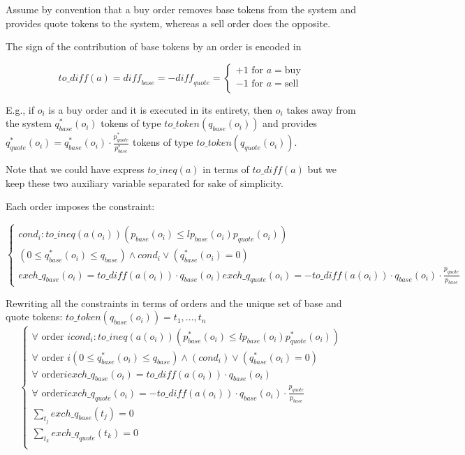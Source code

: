 \documentclass[11pt, reqno]{amsart}
\begin{document}
Assume by convention that a buy order removes base tokens from the system and
provides quote tokens to the system, whereas a sell order does the opposite.

The sign of the contribution of base tokens by an order is encoded in

$$
\mathit{to\_diff}(a) = \mathit{diff}_{base} = -\mathit{diff}_{quote} =
\begin{cases}
  +1 \text{ for } a = \text{buy} \\
  -1 \text{ for } a = \text{sell} \\
\end{cases}
$$

E.g., if $o_i$ is a buy order and it is executed in its entirety, then $o_i$ takes
away from the system
$q^*_{base}(o_i)$ tokens of type $\mathit{to\_token}(q_{base}(o_i))$
and provides
$q^*_{quote}(o_i) = q^*_{base}(o_i) \cdot \frac{p^*_{quote}}{p^*_{base}}$
tokens of type $\mathit{to\_token}(q_{quote}(o_i))$.

Note that we could have express $\mathit{to\_ineq}(a)$ in terms of
$\mathit{to\_diff}(a)$ but we keep these two auxiliary variable separated for
sake of simplicity.

Each order imposes the constraint:

\begin{equation}
  \begin{cases}
    cond_i: \mathit{to\_ineq}(a(o_i))(p_{base}(o_i) \leq lp_{base}(o_i) p_{quote}(o_i)) \\
    (0 \le q^*_{base}(o_i) \le q_{base}) \land cond_i \lor (q^*_{base}(o_i) = 0) \\
    exch\_q_{base}(o_i) = \mathit{to\_diff}(a(o_i)) \cdot q_{base}(o_i)
    exch\_q_{quote}(o_i) = - \mathit{to\_diff}(a(o_i)) \cdot q_{base}(o_i) \cdot \frac{p_{quote}}{p_{base}}
  \end{cases}
\end{equation}

Rewriting all the constraints in terms of orders and the unique set of base and quote tokens:
$\mathit{to\_token}(q_{base}(o_i)) = t_1, ..., t_n$
\begin{equation}
  \begin{cases}
    \forall \text{ order } i cond_i: \mathit{to\_ineq}(a(o_i))(p^*_{base}(o_i) \leq lp_{base}(o_i) p^*_{quote}(o_i)) \\
    \forall \text{ order } i (0 \le q^*_{base}(o_i) \le q_{base}) \land (cond_i) \lor (q^*_{base}(o_i) = 0) \\
    \forall \text{ order} i exch\_q_{base}(o_i) = \mathit{to\_diff}(a(o_i)) \cdot q_{base}(o_i) \\
    \forall \text{ order} i exch\_q_{quote}(o_i) = - \mathit{to\_diff}(a(o_i)) \cdot q_{base}(o_i) \cdot \frac{p_{quote}}{p_{base}} \\
    \sum_{t_j} exch\_q_{base}(t_j) = 0 \\
    \sum_{t_k} exch\_q_{quote}(t_k) = 0 \\
  \end{cases}
\end{equation}
\end{document}
